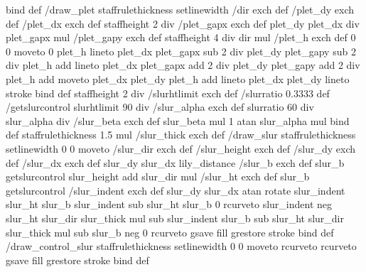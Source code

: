 {{{ } bind def
 /draw_plet
        {
                staffrulethickness setlinewidth
                /dir exch def
                /plet_dy exch def
                /plet_dx exch def
		staffheight 2 div /plet_gapx exch def
		plet_dy plet_dx div plet_gapx mul /plet_gapy exch def
		staffheight 4 div dir mul /plet_h exch def
%
		0 0 moveto
                0 plet_h lineto 
		plet_dx plet_gapx sub 2 div 
			plet_dy plet_gapy sub 2 div plet_h add lineto
		plet_dx plet_gapx add 2 div 
			plet_dy plet_gapy add 2 div plet_h add moveto
		plet_dx plet_dy plet_h add lineto
		plet_dx plet_dy lineto
		stroke
        }
        bind def
 staffheight 2 div /slurhtlimit exch def
 /slurratio 0.3333 def
 /getslurcontrol 
 { 
        slurhtlimit 90 div /slur_alpha exch def
        slurratio 60 div slur_alpha div  /slur_beta  exch def
        slur_beta mul 1 atan slur_alpha mul
 } bind def
 staffrulethickness 1.5 mul  /slur_thick exch def
 /draw_slur
 {
        staffrulethickness setlinewidth
        0 0 moveto
        /slur_dir exch def
        /slur_height exch def
        /slur_dy exch def
        /slur_dx exch def
        slur_dy slur_dx lily_distance /slur_b  exch def
        slur_b getslurcontrol slur_height add
        slur_dir mul /slur_ht exch def
        slur_b getslurcontrol /slur_indent exch def       
%
        slur_dy slur_dx atan rotate
        slur_indent slur_ht
        slur_b slur_indent sub slur_ht
        slur_b 0
        rcurveto        
        slur_indent neg slur_ht slur_dir slur_thick mul  sub
        slur_indent slur_b sub slur_ht slur_dir slur_thick mul  sub
        slur_b neg  0
        rcurveto
        gsave
                fill
        grestore
        stroke
 } bind def
 /draw_control_slur
 {
        staffrulethickness setlinewidth
        0 0 moveto
        rcurveto        
        rcurveto
        gsave
	fill
        grestore
        stroke
 } bind def
}}


\def\turnOnExperimentalFeatures{%
\special{ps:
}}
